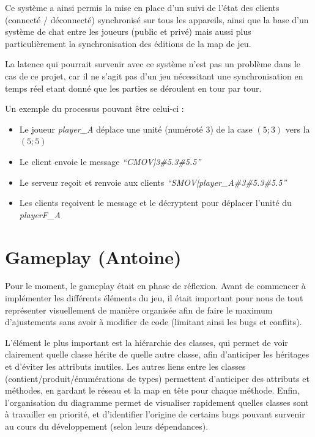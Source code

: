 \documentclass[12pt]{report}
\begin{document}
\vspace{1em}

Ce système a ainsi permis la mise en place d’un suivi de l’état des clients (connecté / déconnecté) synchronisé sur tous les appareils, ainsi que la base d’un système de chat entre les joueurs (public et privé) mais aussi plus particulièrement la synchronisation des éditions de la map de jeu.

La latence qui pourrait survenir avec ce système n’est pas un problème dans le cas de ce projet, car il ne s’agit pas d’un jeu nécessitant une synchronisation en temps réel etant donné que les parties se déroulent en tour par tour.

Un exemple du processus pouvant être celui-ci :

\begin{itemize}[label=\textbullet]
	\item Le joueur \textit{player\_A} déplace une unité (numéroté 3) de la case $(5;3)$ vers la $(5;5)$
	\item Le client envoie le message\textit{ “CMOV|3\#5.3\#5.5”}
	\item Le serveur reçoit et renvoie aux clients\textit{ “SMOV|player\_A\#3\#5.3\#5.5”}
	\item Les clients reçoivent le message et le décryptent pour déplacer l’unité du \textit{playerF\_A}
\end{itemize}

\section{Gameplay (Antoine)}

Pour le moment, le gameplay était en phase de réflexion. Avant de commencer à implémenter les différents éléments du jeu, il était important pour nous de tout représenter visuellement de manière organisée afin de faire le maximum d’ajustements sans avoir à modifier de code (limitant ainsi les bugs et conflits).

L’élément le plus important est la hiérarchie des classes, qui permet de voir clairement quelle classe hérite de quelle autre classe, afin d’anticiper les héritages et d’éviter les attributs inutiles. Les autres liens entre les classes (contient/produit/énumérations de types) permettent d’anticiper des attributs et méthodes, en gardant le réseau et la map en tête pour chaque méthode. Enfin, l’organisation du diagramme permet de visualiser rapidement quelles classes sont à travailler en priorité, et d’identifier l’origine de certains bugs pouvant survenir au cours du développement (selon leurs dépendances).
\end{document}
